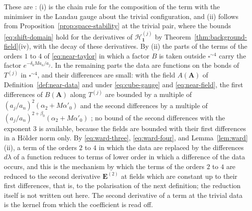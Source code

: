 \documentclass[11pt]{preprint}
\newcommand{\id}{\mathbf 1}
\numberwithin{equation}{section}
\begin{document}
These are \cite[(4.1)--(4.5), pp.~281--282]{BalabanRG1}: (i) is the chain rule for the composition \cite[(4.2)]{BalabanRG1} of the term with the minimiser in the Landau gauge about the trivial configuration, and (ii) follows from Proposition~\ref{prop:space-stability} at the trivial pair, where the bounds \eqref{eq:shift-domain} hold for the derivatives of $\mathcal H^{(j)}_{\id}$ by Theorem~\ref{thm:background-field}(iv), with the decay of these derivatives. By (ii) the parts of the terms of the orders $1$ to $4$ of \eqref{eq:near-taylor} in which a factor $B$ is taken outside $\square^{\sim4}$ carry the factor $e^{-\delta_6Ma_n/a_j}$. In the remaining parts the data are functions on the bonds of $T^{(j)}$ in $\square^{\sim4}$, and their differences are small: with the field $A(\mathbf A)$ of Definition~\ref{def:near-data} and under \eqref{eq:cube-gauge} and \eqref{eq:near-field}, the first differences of $B(\mathbf A)$ along $T^{(j)}$ are bounded by a multiple of $(a_j/a_n)^2(\alpha_2 + M\alpha'_0)$ and the second differences by a multiple of $(a_j/a_n)^{2+\beta_0}(\alpha_2 + M\alpha'_0)$ \cite[(4.17), (4.18)]{BalabanRG1}; no bound of the second differences with the exponent $3$ is available, because the fields are bounded with their first differences in a H\"older norm only. By \eqref{eq:ward-three}, \eqref{eq:ward-four}, and Lemma~\ref{lem:ward}(ii), a term of the orders $2$ to $4$ in which the data are replaced by the differences $d\lambda$ of a function reduces to terms of lower order in which a difference of the data occurs, and this is the mechanism by which the terms of the orders $2$ to $4$ are reduced to the second derivative $\mathbf E^{(2)}$ at fields which are constant up to their first differences, that is, to the polarisation of the next definition; the reduction itself \cite[(4.20)--(4.45)]{BalabanRG1} is not written out here. The second derivative of a term at the trivial data is the kernel from which the coefficient is read off.
\end{document}
